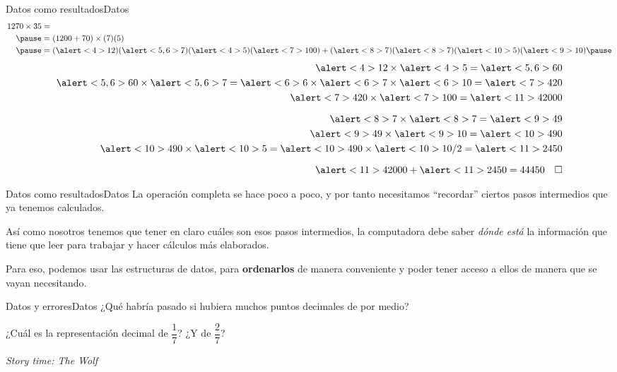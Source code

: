 \documentclass[spanish, c]{beamer}
\begin{document}
\begin{frame}{Datos como resultados}{Datos}
    \begin{align*}
        1270 \times 35 & = \\ \pause
        & = (1200 + 70) \times (7)(5) \\ \pause
        & = (\alert<4>{12})(\alert<5,6>{7})(\alert<4>{5})(\alert<7>{100}) + (\alert<8>{7})(\alert<8>{7})(\alert<10>{5})(\alert<9>{10}) \pause
    \end{align*}
    \vspace{-2ex}
    \begin{align*}
        \alert<4>{12} \times \alert<4>{5} = \alert<5,6>{60} \\
        \alert<5,6>{60} \times \alert<5,6>{7} = \alert<6>{6} \times \alert<6>{7} \times \alert<6>{10} = \alert<7>{420} \\
        \alert<7>{420} \times \alert<7>{100} = \alert<11>{42000} \\[1.5ex]
        \alert<8>{7} \times \alert<8>{7} = \alert<9>{49} \\
        \alert<9>{49} \times \alert<9>{10} = \alert<10>{490} \\
        \alert<10>{490} \times \alert<10>{5} = \alert<10>{490} \times \alert<10>{10 / 2} = \alert<11>{2450}\\[1.5ex]
        \alert<11>{42000} + \alert<11>{2450} = 44450 \quad \square
    \end{align*}
\end{frame}

\begin{frame}{Datos como resultados}{Datos}    
    La operación completa se hace poco a poco, y por tanto necesitamos ``recordar'' ciertos pasos intermedios que ya tenemos calculados. \pause

    \bigskip
    
    Así como nosotros tenemos que tener en claro cuáles son esos pasos intermedios, la computadora debe saber \textit{dónde está} la información que tiene que leer para trabajar y hacer cálculos más elaborados. \pause

    \bigskip

    Para eso, podemos usar las estructuras de datos, para \textbf{ordenarlos} de manera conveniente y poder tener acceso a ellos de manera que se vayan necesitando.

\end{frame}

\begin{frame}{Datos y errores}{Datos}
    ¿Qué habría pasado si hubiera muchos puntos decimales de por medio? \pause

    \bigskip

    ¿Cuál es la representación decimal de $\dfrac{1}{7}$? ¿Y de $\dfrac{2}{7}$? \pause

    \bigskip

    \begin{center}
        \LARGE
        \textit{Story time: The Wolf}
    \end{center}    
\end{frame}
\end{document}
